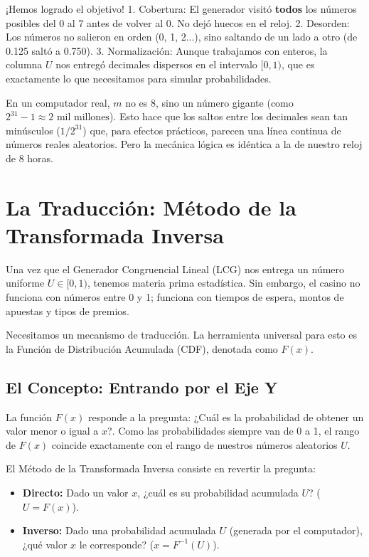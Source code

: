 \documentclass[11pt, letterpaper]{article}
\begin{document}
¡Hemos logrado el objetivo!
1.  Cobertura: El generador visitó \textbf{todos} los números posibles del 0 al 7 antes de volver al 0. No dejó huecos en el reloj.
2.  Desorden: Los números no salieron en orden (0, 1, 2...), sino saltando de un lado a otro (de 0.125 saltó a 0.750).
3.  Normalización: Aunque trabajamos con enteros, la columna $U$ nos entregó decimales dispersos en el intervalo $[0, 1)$, que es exactamente lo que necesitamos para simular probabilidades.

En un computador real, $m$ no es 8, sino un número gigante (como $2^{31}-1 \approx 2 \text{ mil millones}$). Esto hace que los saltos entre los decimales sean tan minúsculos ($1/2^{31}$) que, para efectos prácticos, parecen una línea continua de números reales aleatorios. Pero la mecánica lógica es idéntica a la de nuestro reloj de 8 horas.

\section{La Traducción: Método de la Transformada Inversa}

Una vez que el Generador Congruencial Lineal (LCG) nos entrega un número uniforme $U \in [0, 1)$, tenemos materia prima estadística. Sin embargo, el casino no funciona con números entre 0 y 1; funciona con tiempos de espera, montos de apuestas y tipos de premios.

Necesitamos un mecanismo de traducción. La herramienta universal para esto es la Función de Distribución Acumulada (CDF), denotada como $F(x)$.

\subsection{El Concepto: Entrando por el Eje Y}
La función $F(x)$ responde a la pregunta: ¿Cuál es la probabilidad de obtener un valor menor o igual a $x$?. Como las probabilidades siempre van de 0 a 1, el rango de $F(x)$ coincide exactamente con el rango de nuestros números aleatorios $U$.

El Método de la Transformada Inversa consiste en revertir la pregunta:
\begin{itemize}
    \item \textbf{Directo:} Dado un valor $x$, ¿cuál es su probabilidad acumulada $U$? ($U = F(x)$).
    \item \textbf{Inverso:} Dado una probabilidad acumulada $U$ (generada por el computador), ¿qué valor $x$ le corresponde? ($x = F^{-1}(U)$).
\end{itemize}
\end{document}
